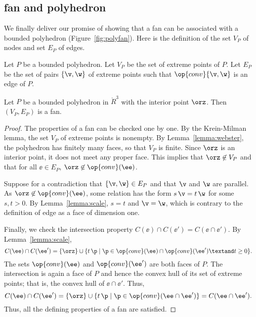 \subsection{fan and polyhedron}

We finally deliver our promise of showing that a fan can be associated with
a bounded polyhedron (Figure~\ref{fig:polyfan}).  Here is the definition
of the set $V_P$ of nodes and set $E_P$ of edges.

\figLSGYGPA %

\begin{definition}[$V_P,E_P$]
Let $P$ be a bounded polyhedron.  Let
$V_P$ be the set of extreme points of $P$.  Let $E_P$ be the set of pairs
$\{\v,\w\}$ of extreme points such that $\op{conv}\{\v,\w\}$ is an edge of
$P$.
\end{definition}
%
%

\begin{lemma}\label{lemma:polyhedron}%
Let $P$ be a bounded polyhedron in $\ring{R}^3$ with the interior
point $\orz$.  Then $(V_P,E_P)$ is a fan.
\end{lemma}
%

\begin{proof} The properties of a fan can be checked one by one.  By
the Krein-Milman lemma, the set $V_P$ of extreme points is nonempty.  By
Lemma~\ref{lemma:webster}, the polyhedron has finitely many faces, so that
$V_P$ is finite.  Since $\orz$ is an interior point, it does not
meet any proper face.  This implies that $\orz\not\in V_P$ and that
for all $\ee\in E_P$, $\orz\not\in \op{conv}(\ee)$.

Suppose for a contradiction that $\{\v,\w\}\in E_P$ and that $\v$
and $\w$ are parallel.  As $\orz\not\in \op{conv}(\ee)$, some
relation has the form $s\, \v = t\, \w$ for some $s, t>0$.  By
Lemma~\ref{lemma:scale}, $s=t$ and $\v=\w$, which is contrary to the
definition of edge as a face of dimension one.

Finally, we check the intersection property $C(\ee)\cap C(\ee') = C(\ee \cap
\ee')$.  By Lemma~\ref{lemma:scale},
\[ 
C(\ee) \cap C(\ee') =
 \{\orz\}\cup \{t\, \p \mid \p\in \op{conv}(\ee) \cap \op{conv}(\ee') 
\textand  t \ge 0\}.
\] 
The sets $\op{conv}(\ee)$ and $\op{conv}(\ee')$ are both faces of $P$.  The
intersection is again a face of $P$ and hence the convex
hull of its set of extreme points; that is, the convex hull of $\ee \cap \ee'$.
Thus,
\[ 
C(\ee)\cap C(\ee') = \{\orz\}\cup \{t\, \p \mid \p\in 
\op{conv}(\ee\cap \ee')\} = C(\ee \cap \ee').
\] 
Thus, all the defining properties of a fan are satisfied.
\end{proof}

